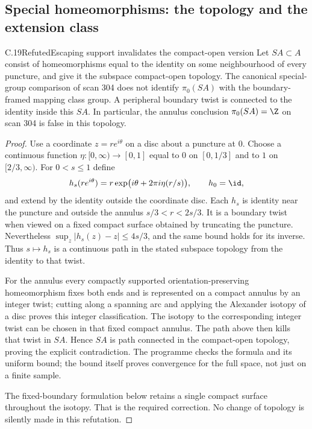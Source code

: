 \subsection{Special homeomorphisms: the topology and the extension class}

\begin{claim}{C.19}{Refuted}{Escaping support invalidates the compact-open version}
Let $SA\subset A$ consist of homeomorphisms equal to the identity on
some neighbourhood of every puncture, and give it the subspace
compact-open topology. The canonical special-group comparison of
scan 304 does not identify $\pi_0(SA)$ with the boundary-framed mapping
class group. A peripheral boundary twist is connected to the identity
inside this $SA$. In particular, the annulus conclusion
$\pi_0(SA)=\Z$ on scan 304 is false in this topology.
\end{claim}
\begin{proof}
Use a coordinate $z=re^{i\theta}$ on a disc about a puncture at $0$.
Choose a continuous function $\eta:[0,\infty)\to[0,1]$ equal to $0$ on
$[0,1/3]$ and to $1$ on $[2/3,\infty)$. For $0<s\leq1$ define
\[
 h_s(re^{i\theta})=r\exp\bigl(i\theta+2\pi i\eta(r/s)\bigr),
 \qquad h_0=\id,
\]
and extend by the identity outside the coordinate disc. Each $h_s$ is
identity near the puncture and outside the annulus
$s/3<r<2s/3$. It is a boundary twist when viewed on a fixed compact
surface obtained by truncating the puncture. Nevertheless
$\sup_z|h_s(z)-z|\leq4s/3$, and the same bound holds for its inverse.
Thus $s\mapsto h_s$ is a continuous path in the stated subspace topology
from the identity to that twist.

For the annulus every compactly supported orientation-preserving
homeomorphism fixes both ends and is represented on a compact annulus
by an integer twist; cutting along a spanning arc and applying the
Alexander isotopy of a disc proves this integer classification. The
isotopy to the corresponding integer twist can be chosen in that fixed
compact annulus. The path above then kills that twist in $SA$. Hence
$SA$ is path connected in the compact-open topology, proving the
explicit contradiction. The programme checks the formula and its
uniform bound; the bound itself proves convergence for the full space,
not just on a finite sample.

The fixed-boundary formulation below retains a single compact surface
throughout the isotopy. That is the required correction. No change of
topology is silently made in this refutation.
\end{proof}

